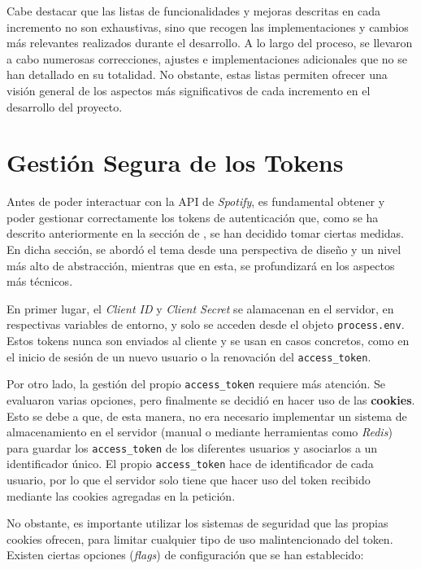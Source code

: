 Cabe destacar que las listas de funcionalidades y mejoras descritas en cada incremento no son exhaustivas, sino que recogen las implementaciones y cambios más relevantes realizados durante el desarrollo. A lo largo del proceso, se llevaron a cabo numerosas correcciones, ajustes e implementaciones adicionales que no se han detallado en su totalidad. No obstante, estas listas permiten ofrecer una visión general de los aspectos más significativos de cada incremento en el desarrollo del proyecto.

\section{Gestión Segura de los Tokens}

Antes de poder interactuar con la API de \textit{Spotify}, es fundamental obtener y poder gestionar correctamente los tokens de autenticación que, como se ha descrito anteriormente en la sección de , se han decidido tomar ciertas medidas. En dicha sección, se abordó el tema desde una perspectiva de diseño y un nivel más alto de abstracción, mientras que en esta, se profundizará en los aspectos más técnicos.

En primer lugar, el \textit{Client ID} y \textit{Client Secret} se alamacenan en el servidor, en respectivas variables de entorno, y solo se acceden desde el objeto \texttt{process.env}. Estos tokens nunca son enviados al cliente y se usan en casos concretos, como en el inicio de sesión de un nuevo usuario o la renovación del \texttt{access\_token}.

Por otro lado, la gestión del propio \texttt{access\_token} requiere más atención. Se evaluaron varias opciones, pero finalmente se decidió en hacer uso de las \textbf{cookies}. Esto se debe a que, de esta manera, no era necesario implementar un sistema de almacenamiento en el servidor (manual o mediante herramientas como \textit{Redis}) para guardar los \texttt{access\_token} de los diferentes usuarios y asociarlos a un identificador único. El propio \texttt{access\_token} hace de identificador de cada usuario, por lo que el servidor solo tiene que hacer uso del token recibido mediante las cookies agregadas en la petición.

No obstante, es importante utilizar los sistemas de seguridad que las propias cookies ofrecen, para limitar cualquier tipo de uso malintencionado del token. Existen ciertas opciones (\textit{flags}) de configuración que se han establecido:


